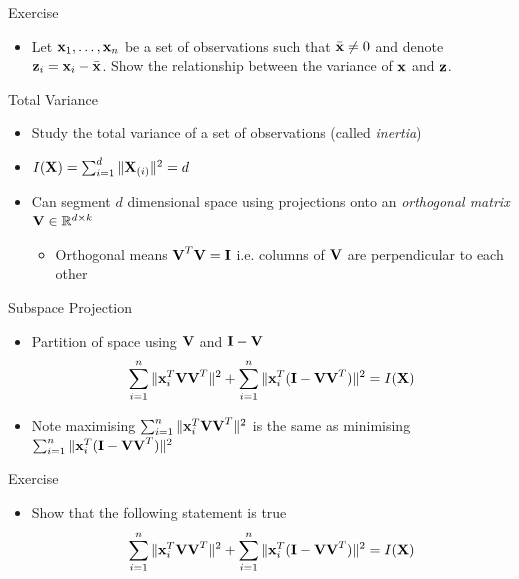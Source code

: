 \documentclass{beamer}
\begin{document}
\begin{frame}{Exercise}
\begin{itemize} 
 \item Let $\textbf{x}_1, \ldots, \textbf{x}_n$ be a set of observations such that $\bar{\textbf{x}} \neq 0$ and denote $\textbf{z}_i = \textbf{x}_i - \bar{\textbf{x}}$. Show the relationship between the variance of $\textbf{x}$ and $\textbf{z}$. 
\end{itemize}
 
\end{frame}


\begin{frame}{Total Variance} 
\begin{itemize} 
 \item Study the total variance of a set of observations (called \emph{inertia})
 \item $I(\textbf{X}) = \sum_{i=1}^d \|\textbf{X}_{(i)}\|^2 = d$
 \item Can segment $d$ dimensional space using projections onto an \emph{orthogonal matrix} $\textbf{V} \in \mathbb{R}^{d \times k}$ 
 \begin{itemize}
  \item Orthogonal means $\textbf{V}^T\textbf{V} = \textbf{I}$ i.e. columns of $\textbf{V}$ are perpendicular to each other
 \end{itemize}
\end{itemize}
\end{frame}

\begin{frame}{Subspace Projection}
\begin{itemize} 
 \item Partition of space using $\textbf{V}$ and $\textbf{I} - \textbf{V}$
 \begin{displaymath}
  \sum_{i=1}^n \|\textbf{x}_{i}^T\textbf{V}\textbf{V}^T \|^2 + \sum_{i=1}^n \|\textbf{x}_{i}^T(\textbf{I} - \textbf{V}\textbf{V}^T)\|^2 = I(\textbf{X})
 \end{displaymath}
\item Note maximising $\sum_{i=1}^n \|\textbf{x}_{i}^T\textbf{V}\textbf{V}^T \|^2 $ is the same as minimising $\sum_{i=1}^n \|\textbf{x}_{i}^T(\textbf{I} - \textbf{V}\textbf{V}^T)\|^2$ 
\end{itemize}
\end{frame}

\begin{frame}{Exercise} 
\begin{itemize} 
 \item Show that the following statement is true
  \begin{displaymath}
  \sum_{i=1}^n \|\textbf{x}_{i}^T\textbf{V}\textbf{V}^T \|^2 + \sum_{i=1}^n \|\textbf{x}_{i}^T(\textbf{I} - \textbf{V}\textbf{V}^T)\|^2 = I(\textbf{X})
 \end{displaymath}
\end{itemize}
\end{frame}
\end{document}
